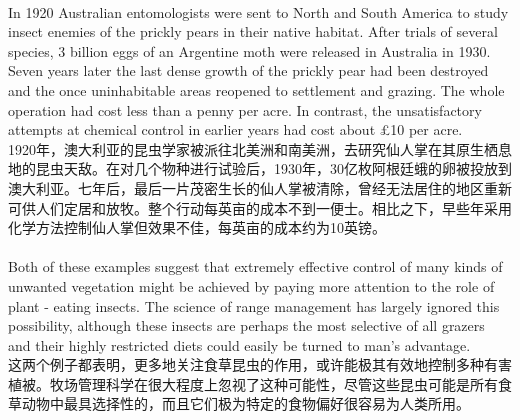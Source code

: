 \documentclass{article}
\begin{document}
\\
In 1920 Australian entomologists were sent to North and South America to study insect enemies of the prickly pears in their native habitat. After trials of several species, 3 billion eggs of an Argentine moth were released in Australia in 1930. Seven years later the last dense growth of the prickly pear had been destroyed and the once uninhabitable areas reopened to settlement and grazing. The whole operation had cost less than a penny per acre. In contrast, the unsatisfactory attempts at chemical control in earlier years had cost about £10 per acre.\\
1920年，澳大利亚的昆虫学家被派往北美洲和南美洲，去研究仙人掌在其原生栖息地的昆虫天敌。在对几个物种进行试验后，1930年，30亿枚阿根廷蛾的卵被投放到澳大利亚。七年后，最后一片茂密生长的仙人掌被清除，曾经无法居住的地区重新可供人们定居和放牧。整个行动每英亩的成本不到一便士。相比之下，早些年采用化学方法控制仙人掌但效果不佳，每英亩的成本约为10英镑。 \\

\\
Both of these examples suggest that extremely effective control of many kinds of unwanted vegetation might be achieved by paying more attention to the role of plant - eating insects. The science of range management has largely ignored this possibility, although these insects are perhaps the most selective of all grazers and their highly restricted diets could easily be turned to man’s advantage.\\
这两个例子都表明，更多地关注食草昆虫的作用，或许能极其有效地控制多种有害植被。牧场管理科学在很大程度上忽视了这种可能性，尽管这些昆虫可能是所有食草动物中最具选择性的，而且它们极为特定的食物偏好很容易为人类所用。\\
\end{document}
